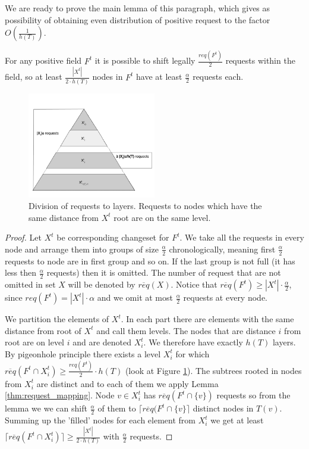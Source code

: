 We are ready to prove the main lemma of this paragraph, which gives as 
possibility of obtaining even distribution of positive request to the factor 
$O(\frac{1}{h(T)})$.
\begin{lemma}
For any positive field $F^t$ it is possible to shift 
legally $\frac{req(F^t)}{2}$ requests within the field, so at least 
$\frac{|X^t|}{2 \cdot h(T)}$ nodes in $F^t$ have at least 
$\frac{\alpha}{2}$ requests each.
\label{thm:legal_shifting_down}
\end{lemma}
 \begin{figure}
 \begin{center}
  \includegraphics[width=0.5\textwidth]{layers.png}
\end{center}
\caption{Division of requests to layers. Requests to nodes which have the same 
distance from $X^t$ root are on the same level.}
\label{fig:layers}
\end{figure}
\begin{proof}
Let $X^t$ be corresponding changeset for $F^t$. We take all the requests in 
every node and arrange them into groups of size $\frac{\alpha}{2}$ 
chronologically, meaning first $\frac{\alpha}{2}$ requests to node are in first 
group and so on. If the last group is not full (it has less then  
$\frac{\alpha}{2}$ requests) then it is omitted. The number of request that are 
not omitted in set $X$ will be denoted by $\overline{req}(X)$. Notice that  
$\overline{req}(F^t) \geq |X^t| \cdot \frac{\alpha}{2}$, since $req(F^t) = 
|X^t| \cdot \alpha$ and we omit at most $\frac{\alpha}{2}$ requests at every 
node.

We partition the elements of $X^t$. In each part there are elements with the 
same distance from root of $X^t$ and call them levels. The nodes that are 
distance $i$ from root are on level $i$ and are denoted $X^t_i$. We therefore 
have exactly $h(T)$ layers. By pigeonhole principle there exists a level 
$X^t_i$ for which $\overline{req}(F^t \cap X^t_i) \geq \frac{req(F^t)}{2} \cdot 
h(T)$ (look at Figure \ref{fig:layers}). The subtrees rooted in nodes from 
$X^t_i$ are distinct and to each of them we apply Lemma 
\ref{thm:request_mapping}. Node $v \in X^t_i$ has $\overline{req}(F^t \cap 
\{v\})$ requests so from the lemma we we can shift $\frac{\alpha}{2}$ of 
them to $\lceil \overline{req}(F^t \cap \{v\} \rceil$ distinct nodes in $T(v)$. 
Summing up the 'filled' nodes for each element from $X^t_i$ we get at least 
$\lceil \overline{req}(F^t \cap X^t_i) \rceil \geq \frac{|X^t|}{2 \cdot h(T)}$ 
with $\frac{\alpha}{2}$ requests.
\end{proof}
